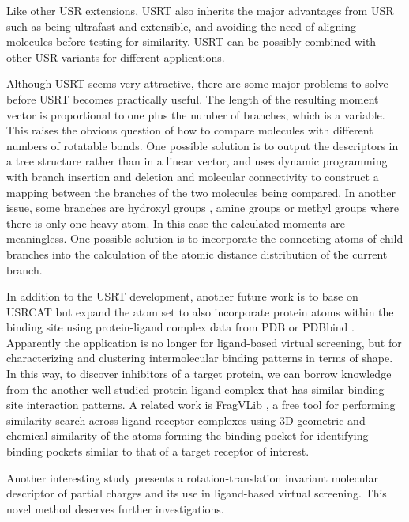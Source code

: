 Like other USR extensions, USRT also inherits the major advantages from USR such as being ultrafast and extensible, and avoiding the need of aligning molecules before testing for similarity. USRT can be possibly combined with other USR variants \citep{1333,1338,1331} for different applications.

Although USRT seems very attractive, there are some major problems to solve before USRT becomes practically useful. The length of the resulting moment vector is proportional to one plus the number of branches, which is a variable. This raises the obvious question of how to compare molecules with different numbers of rotatable bonds. One possible solution is to output the descriptors in a tree structure rather than in a linear vector, and uses dynamic programming with branch insertion and deletion and molecular connectivity to construct a mapping between the branches of the two molecules being compared. In another issue, some branches are hydroxyl groups , amine groups  or methyl groups  where there is only one heavy atom. In this case the calculated moments are meaningless. One possible solution is to incorporate the connecting atoms of child branches into the calculation of the atomic distance distribution of the current branch.

In addition to the USRT development, another future work is to base on USRCAT \citep{1331} but expand the atom set to also incorporate protein atoms within the binding site using protein-ligand complex data from PDB \citep{540,537} or PDBbind \citep{529,530,1426}. Apparently the application is no longer for ligand-based virtual screening, but for characterizing and clustering intermolecular binding patterns in terms of shape. In this way, to discover inhibitors of a target protein, we can borrow knowledge from the another well-studied protein-ligand complex that has similar binding site interaction patterns. A related work is FragVLib \citep{1247}, a free tool for performing similarity search across ligand-receptor complexes using 3D-geometric and chemical similarity of the atoms forming the binding pocket for identifying binding pockets similar to that of a target receptor of interest.%

Another interesting study \citep{1389} presents a rotation-translation invariant molecular descriptor of partial charges and its use in ligand-based virtual screening. This novel method deserves further investigations.

\chapterend

